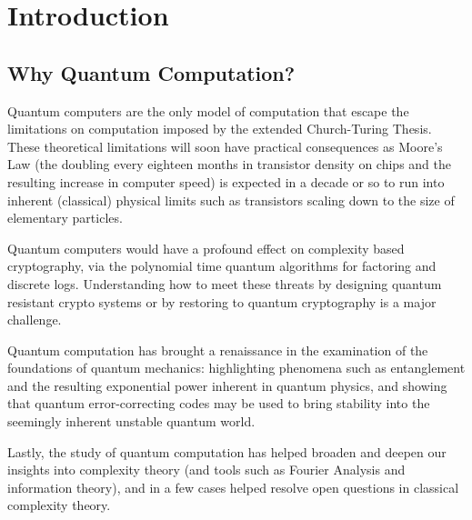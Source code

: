 \chapter{Introduction}
\section{Why Quantum Computation?}
Quantum computers are the only model of computation that escape the limitations on computation imposed by the extended Church-Turing Thesis. These theoretical limitations will soon have practical consequences as Moore's Law (the doubling every eighteen months in transistor density on chips and the resulting increase in computer speed) is expected in a decade or so to run into inherent (classical) physical limits such as transistors scaling down to the size of elementary particles. 

Quantum computers would have a profound effect on complexity based cryptography, via the polynomial time quantum algorithms for factoring and discrete logs. Understanding how to meet these threats by designing quantum resistant crypto systems or by restoring to quantum cryptography is a major challenge.

Quantum computation has brought a renaissance in the examination of the foundations of quantum mechanics: highlighting phenomena such as entanglement and the resulting exponential power inherent in quantum physics, and showing that quantum error-correcting codes may be used to bring stability into the seemingly inherent unstable quantum world.

Lastly, the study of quantum computation has helped broaden and deepen our insights into complexity theory (and tools such as Fourier Analysis and information theory), and in a few cases helped resolve open questions in classical complexity theory.


